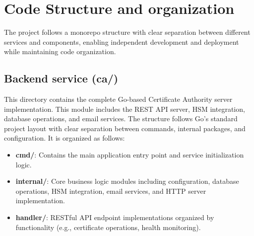


\section{Code Structure and organization}

The project follows a monorepo structure with clear separation between different 
services and components, enabling independent development and deployment while 
maintaining code organization.

\subsection{Backend service (ca/)}
This directory contains the complete Go-based Certificate Authority 
server implementation. This module includes the REST API server, HSM integration, 
database operations, and email services. The structure follows Go's standard 
project layout with clear separation between commands, internal packages, and 
configuration. It is organized as follows:
\begin{itemize}
    \item \textbf{cmd/}: Contains the main application entry point and service 
    initialization logic.
    \item \textbf{internal/}: Core business logic modules including configuration, 
    database operations, HSM integration, email services, and HTTP server implementation.
    \item \textbf{handler/}: RESTful API endpoint implementations organized by 
    functionality (e.g., certificate operations, health monitoring).
\end{itemize}

